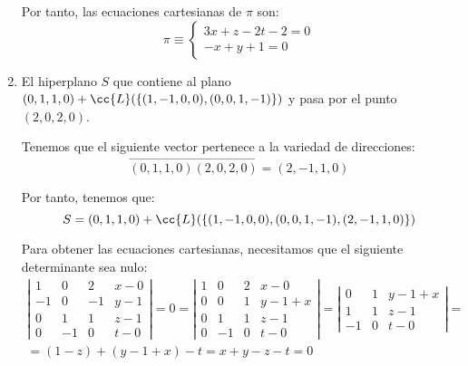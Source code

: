 \begin{ejercicio}
\begin{enumerate}
        Por tanto, las ecuaciones cartesianas de $\pi$ son:
        \begin{equation*}
            \pi\equiv \left\{\begin{array}{l}
                3x+z-2t-2=0\\
                -x+y+1=0
            \end{array}\right.
        \end{equation*}

        
        
        \item El hiperplano $S$ que contiene al plano $(0, 1, 1, 0) + \cc{L}(\{(1, -1, 0, 0), (0, 0, 1, -1)\})$ y pasa por el punto $(2, 0, 2, 0)$.

        Tenemos que el siguiente vector pertenece a la variedad de direcciones:
        \begin{equation*}
            \vec{(0,1,1,0)(2,0,2,0)} = (2,-1,1,0)
        \end{equation*}

        Por tanto, tenemos que:
        $$S=(0, 1, 1, 0) + \cc{L}(\{(1, -1, 0, 0), (0, 0, 1, -1), (2,-1,1,0)\})$$

        Para obtener las ecuaciones cartesianas, necesitamos que el siguiente determinante sea nulo:
        \begin{multline*}
            \left|\begin{array}{cccc}
                1 & 0 & 2 & x-0 \\
                -1 & 0 & -1 & y-1\\
                0 & 1 & 1 & z-1\\
                0 & -1 & 0 & t-0
            \end{array}\right| = 0 = 
            \left|\begin{array}{cccc}
                1 & 0 & 2 & x-0 \\
                0 & 0 & 1 & y-1+x\\
                0 & 1 & 1 & z-1\\
                0 & -1 & 0 & t-0
            \end{array}\right| =
            \left|\begin{array}{ccc}
                0 & 1 & y-1+x\\
                1 & 1 & z-1\\
                -1 & 0 & t-0
            \end{array}\right| =\\
            = (1-z)+(y-1+x)-t = x+y-z-t=0
        \end{multline*}


\end{enumerate}
\end{ejercicio}

